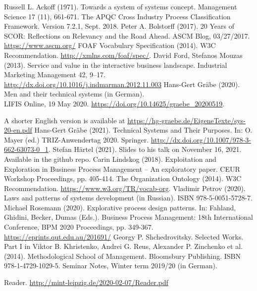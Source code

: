 \documentclass[11pt,a4paper]{article}
\begin{document}
\raggedright
\begin{thebibliography}{xxx}
 Russell L. Ackoff (1971). Towards a system of systems
  concept.  Management Science 17 (11), 661-671.
 The APQC Cross Industry Process Classification Framework.
  Version 7.2.1, Sept. 2018.
 Peter A. Bolstorff (2017).  20 Years of SCOR:
  Reflections on Relevancy and the Road Ahead. ASCM Blog, 03/27/2017.
  \url{https://www.ascm.org/}
 FOAF Vocabulary Specification (2014). W3C Recommendation.
  \url{http://xmlns.com/foaf/spec/}.
 David Ford, Stefanos Mouzas (2013). Service and value
  in the interactive business landscape. Industrial Marketing Management 42,
  9–17.  \url{http://dx.doi.org/10.1016/j.indmarman.2012.11.003}
 Hans-Gert Gräbe (2020). Men and their technical systems
  (in German).\\ LIFIS Online, 19 May 2020.
  \url{https://doi.org/10.14625/graebe_20200519}.

  A shorter English version is available at
  \url{https://hg-graebe.de/EigeneTexte/sys-20-en.pdf}
 Hans-Gert Gräbe (2021). Technical Systems and Their
  Purposes. In: O. Mayer (ed.) TRIZ-Anwendertag 2020. Springer.
  \url{http://dx.doi.org/10.1007/978-3-662-63073-0_1}.
 Stefan Härtel (2021). Slides to his talk on November 16,
  2021.  Available in the github repo.
 Carin Lindskog (2018). Exploitation and Exploration in
  Business Process Management – An exploratory paper. CEUR Workshop
  Proceedings, pp. 405-414.
 The Organization Ontology (2014). W3C Recommendation.
  \url{https://www.w3.org/TR/vocab-org}.
 Vladimir Petrov (2020). Laws and patterns of systems
  development (in Russian). ISBN 978-5-0051-5728-7.
 Michael Rosemann (2020). Explorative process design
  patterns. In: Fahland, Ghidini, Becker, Dumas (Eds.). Business Process
  Management: 18th International Conference, BPM 2020 Proceedings,
  pp. 349-367. \url{https://eprints.qut.edu.au/201691/}
 Georgy P. Shchedrovitsky. Selected Works. Part I in Viktor
  B. Khristenko, Andrei G. Reus, Alexander P. Zinchenko et al. (2014).
  Methodological School of Management. Bloomsbury Publishing.  ISBN
  978-1-4729-1029-5.
 Seminar Notes, Winter term 2019/20 (in German).

  Reader. \url{http://mint-leipzig.de/2020-02-07/Reader.pdf}
  

\end{thebibliography}
\end{document}
